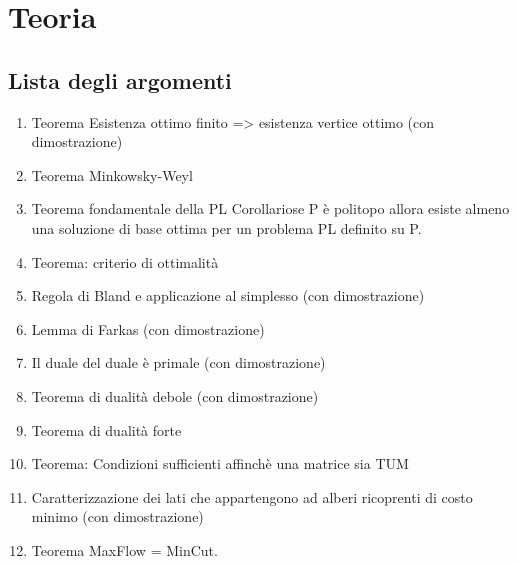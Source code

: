 \documentclass[\main/main.tex]{subfiles}
\begin{document}
\chapter{Teoria}

\section{Lista degli argomenti}
\begin{enumerate}
  \item Teorema Esistenza ottimo finito => esistenza vertice ottimo (con dimostrazione)
  \item Teorema Minkowsky-Weyl
  \item Teorema fondamentale della PL
        \subitem Corollariose P è politopo allora esiste almeno una soluzione di base ottima per un problema PL definito su P.
  \item Teorema: criterio di ottimalità
  \item Regola di Bland e applicazione al simplesso (con dimostrazione)
  \item Lemma di Farkas (con dimostrazione)
  \item Il duale del duale è primale (con dimostrazione)
  \item Teorema di dualità debole (con dimostrazione)
  \item Teorema di dualità forte
  \item Teorema: Condizioni sufficienti affinchè una matrice sia TUM
  \item Caratterizzazione dei lati che appartengono ad alberi ricoprenti di costo minimo (con dimostrazione)
  \item Teorema MaxFlow = MinCut.
\end{enumerate}


\end{document}
